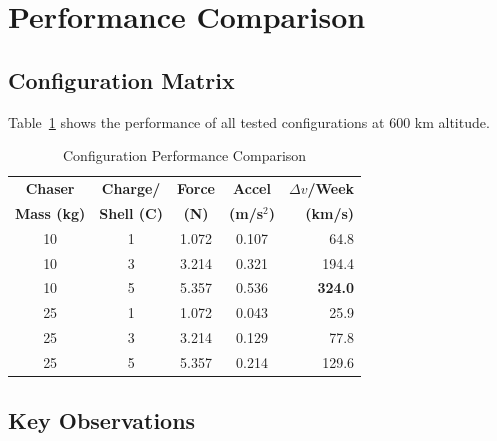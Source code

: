 \documentclass[11pt,a4paper]{article}
\begin{document}
\section{Performance Comparison}

\subsection{Configuration Matrix}

Table~\ref{tab:config} shows the performance of all tested configurations at 600 km altitude.

\begin{table}[h!]
\centering
\caption{Configuration Performance Comparison}
\label{tab:config}
\begin{tabular}{ccccr}
\toprule
\textbf{Chaser} & \textbf{Charge/} & \textbf{Force} & \textbf{Accel} & \textbf{$\Delta v$/Week} \\
\textbf{Mass (kg)} & \textbf{Shell (C)} & \textbf{(N)} & \textbf{(m/s$^2$)} & \textbf{(km/s)} \\
\midrule
10 & 1 & 1.072 & 0.107 & 64.8 \\
10 & 3 & 3.214 & 0.321 & 194.4 \\
10 & 5 & 5.357 & 0.536 & \textbf{324.0} \\
\midrule
25 & 1 & 1.072 & 0.043 & 25.9 \\
25 & 3 & 3.214 & 0.129 & 77.8 \\
25 & 5 & 5.357 & 0.214 & 129.6 \\
\bottomrule
\end{tabular}
\end{table}

\subsection{Key Observations}
\end{document}
